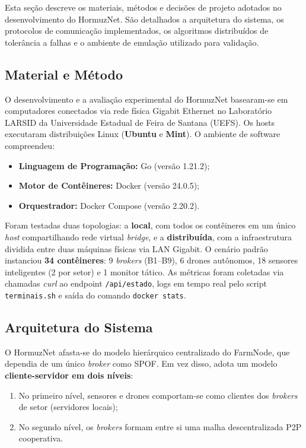 Esta seção descreve os materiais, métodos e decisões de projeto adotados no desenvolvimento do HormuzNet. São detalhados a arquitetura do sistema, os protocolos de comunicação implementados, os algoritmos distribuídos de tolerância a falhas e o ambiente de emulação utilizado para validação.

\subsection{Material e Método}
\label{sub:material_metodo}

O desenvolvimento e a avaliação experimental do HormuzNet basearam-se em computadores conectados via rede física Gigabit Ethernet no Laboratório LARSID da Universidade Estadual de Feira de Santana (UEFS). Os hosts executaram distribuições Linux (\textbf{Ubuntu} e \textbf{Mint}). O ambiente de software compreendeu:
\begin{itemize}
    \item \textbf{Linguagem de Programação:} Go (versão 1.21.2);
    \item \textbf{Motor de Contêineres:} Docker (versão 24.0.5);
    \item \textbf{Orquestrador:} Docker Compose (versão 2.20.2).
\end{itemize}

Foram testadas duas topologias: a \textbf{local}, com todos os contêineres em um único \textit{host} compartilhando rede virtual \textit{bridge}, e a \textbf{distribuída}, com a infraestrutura dividida entre duas máquinas físicas via LAN Gigabit. O cenário padrão instanciou \textbf{34 contêineres}: 9 \textit{brokers} (B1--B9), 6 drones autônomos, 18 sensores inteligentes (2 por setor) e 1 monitor tático. As métricas foram coletadas via chamadas \textit{curl} ao endpoint \texttt{/api/estado}, logs em tempo real pelo script \texttt{terminais.sh} e saída do comando \texttt{docker stats}.

\subsection{Arquitetura do Sistema}
\label{sub:arquitetura}

O HormuzNet afasta-se do modelo hierárquico centralizado do FarmNode, que dependia de um único \textit{broker} como SPOF. Em vez disso, adota um modelo \textbf{cliente-servidor em dois níveis}:
\begin{enumerate}
    \item[(i)] No primeiro nível, sensores e drones comportam-se como clientes dos \textit{brokers} de setor (servidores locais);
    \item[(ii)] No segundo nível, os \textit{brokers} formam entre si uma malha descentralizada P2P cooperativa.
\end{enumerate}

